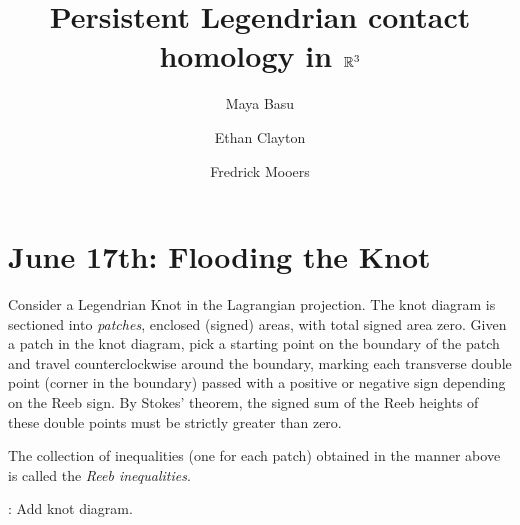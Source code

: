 \documentclass[11pt,oneside]{amsart}
\begin{document}
\author{Maya Basu}
\author{Ethan Clayton}
\author{Fredrick Mooers}

\address{University of California, Berkeley}

\address{University of Illinois, Urbana-Champaign}

\address{Virginia Tech}

\title{Persistent Legendrian contact homology in $\mathbb R^3$}




\maketitle

\tableofcontents
\newpage

\section{June 17th: Flooding the Knot}

Consider a Legendrian Knot in the Lagrangian projection. The knot diagram is sectioned into \textit{patches}, enclosed (signed) areas, with total signed area zero. Given a patch in the knot diagram, pick a starting point on the boundary of the patch and travel counterclockwise around the boundary, marking each transverse double point (corner in the boundary) passed with a positive or negative sign depending on the Reeb sign. By Stokes' theorem, the signed sum of the Reeb heights of these double points must be strictly greater than zero.

\begin{definition}
\label{def:ReebIneq}
The collection of inequalities (one for each patch) obtained in the manner above is called the \textit{Reeb inequalities}.
\end{definition}

\begin{example}
\TODO: Add knot diagram.
    
\end{example}
\end{document}
